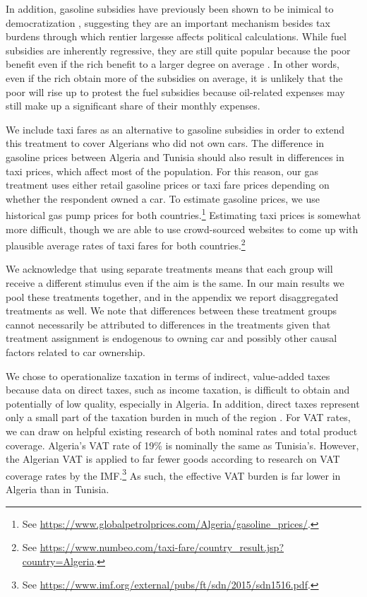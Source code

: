 \documentclass[12pt, letterpaper]{article}
\begin{document}
In addition, gasoline subsidies have previously been shown to be inimical to democratization \parencite{fails_fuel_2019}, suggesting they are an important mechanism besides tax burdens through which rentier largesse affects political calculations. While fuel subsidies are inherently regressive, they are still quite popular because the poor benefit even if the rich benefit to a larger degree on average \parencite{kyle_local_2018}. In other words, even if the rich obtain more of the subsidies on average, it is unlikely that the poor will rise up to protest the fuel subsidies because oil-related expenses may still make up a significant share of their monthly expenses. 

We include taxi fares as an alternative to gasoline subsidies in order to extend this treatment to cover Algerians who did not own cars. The difference in gasoline prices between Algeria and Tunisia should also result in differences in taxi prices, which affect most of the population. For this reason, our gas treatment uses either retail gasoline prices or taxi fare prices depending on whether the respondent owned a car. To estimate gasoline prices, we use historical gas pump prices for both countries.\footnote{See \url{https://www.globalpetrolprices.com/Algeria/gasoline_prices/}.} Estimating taxi prices is somewhat more difficult, though we are able to use crowd-sourced websites to come up with plausible average rates of taxi fares for both countries.\footnote{See \url{https://www.numbeo.com/taxi-fare/country_result.jsp?country=Algeria}.} 

We acknowledge that using separate treatments means that each group will receive a different stimulus even if the aim is the same. In our main results we pool these treatments together, and in the appendix we report disaggregated treatments as well. We note that differences between these treatment groups cannot necessarily be attributed to differences in the treatments given that treatment assignment is endogenous to owning car and possibly other causal factors related to car ownership.

We chose to operationalize taxation in terms of indirect, value-added taxes because data on direct taxes, such as income taxation, is difficult to obtain and potentially of low quality, especially in Algeria. In addition, direct taxes represent only a small part of the taxation burden in much of the region \parencite{jewell_fair_2015}. For VAT rates, we can draw on helpful existing research of both nominal rates and total product coverage. Algeria's VAT rate of 19\% is nominally the same as Tunisia's. However, the Algerian VAT is applied to far fewer goods according to research on VAT coverage rates by the IMF.\footnote{See \url{https://www.imf.org/external/pubs/ft/sdn/2015/sdn1516.pdf}.} As such, the effective VAT burden is far lower in Algeria than in Tunisia.
\end{document}
